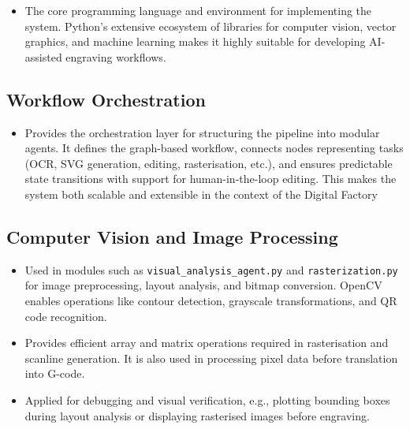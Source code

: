 \begin{itemize}
\item {} 

The core programming language and environment for implementing the system. Python’s extensive ecosystem of libraries for computer vision, vector graphics, and machine learning makes it highly suitable for developing AI-assisted engraving workflows.

\end{itemize}

\subsection{Workflow Orchestration}

\begin{itemize}
\item {}

Provides the orchestration layer for structuring the pipeline into modular agents. It defines the graph-based workflow, connects nodes representing tasks (OCR, SVG generation, editing, rasterisation, etc.), and ensures predictable state transitions with support for human-in-the-loop editing. This makes the system both scalable and extensible in the context of the Digital Factory

\end{itemize}

\subsection{Computer Vision and Image Processing}

\begin{itemize}
	\item {}
	
	Used in modules such as \texttt{visual\_analysis\_agent.py} and \texttt{rasterization.py} for image preprocessing, layout analysis, and bitmap conversion. OpenCV enables operations like contour detection, grayscale transformations, and QR code recognition.
	
	\item {}
	
	Provides efficient array and matrix operations required in rasterisation and scanline generation. It is also used in processing pixel data before translation into G-code.
	
	\item {}
	
	Applied for debugging and visual verification, e.g., plotting bounding boxes during layout analysis or displaying rasterised images before engraving.
\end{itemize}

